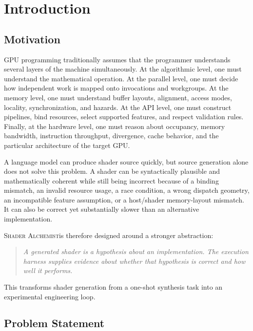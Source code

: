 \documentclass[11pt,a4paper,oneside]{report}
\newcommand{\SA}{\textsc{Shader Alchemist}}
\begin{document}
\begingroup
\small
\tableofcontents
\endgroup
\listoffigures

\chapter{Introduction}

\section{Motivation}

GPU programming traditionally assumes that the programmer understands several layers of the
machine simultaneously. At the algorithmic level, one must understand the mathematical operation.
At the parallel level, one must decide how independent work is mapped onto invocations and
workgroups. At the memory level, one must understand buffer layouts, alignment, access modes,
locality, synchronization, and hazards. At the API level, one must construct pipelines, bind
resources, select supported features, and respect validation rules. Finally, at the hardware level,
one must reason about occupancy, memory bandwidth, instruction throughput, divergence, cache
behavior, and the particular architecture of the target GPU.

A language model can produce shader source quickly, but source generation alone does not solve this
problem. A shader can be syntactically plausible and mathematically coherent while still being
incorrect because of a binding mismatch, an invalid resource usage, a race condition, a wrong
dispatch geometry, an incompatible feature assumption, or a host/shader memory-layout mismatch.
It can also be correct yet substantially slower than an alternative implementation.

\SA is therefore designed around a stronger abstraction:

\begin{quote}
\emph{A generated shader is a hypothesis about an implementation. The execution harness supplies
evidence about whether that hypothesis is correct and how well it performs.}
\end{quote}

This transforms shader generation from a one-shot synthesis task into an experimental engineering
loop.

\section{Problem Statement}
\end{document}
